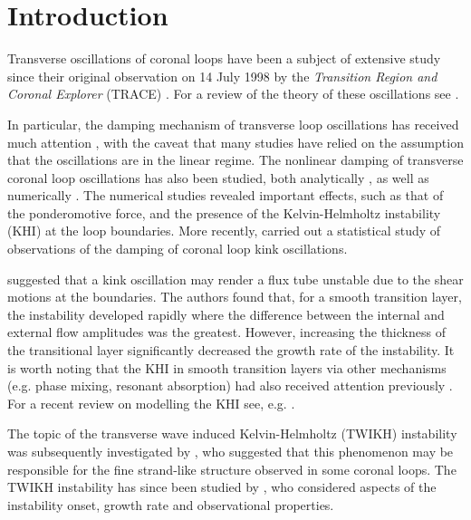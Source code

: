 \documentclass[12pt]{ociamthesis}
\begin{document}
\section{Introduction}
\label{sec:c3intro}

Transverse oscillations of coronal loops have been a subject of extensive study since their original observation on 14 July 1998 by the \textit{Transition Region and Coronal Explorer} (TRACE) \citep{Aschwanden1999, Nakariakov1999}. For a review of the theory of these oscillations see \cite{Ruderman2009}.

In particular, the damping mechanism of transverse loop oscillations has received much attention \citep[e.g.][]{Ruderman2002, Goossens2002, TVD2004, Dymova2006, Williamson2014}, with the caveat that many studies have relied on the assumption that the oscillations are in the linear regime.
The nonlinear damping of transverse coronal loop oscillations has also been studied, both analytically \citep{Ruderman2010b, Ruderman2014, Ruderman2017}, as well as numerically \citep[e.g.][]{Terradas2004, Magyar2016a}.
The numerical studies revealed important effects, such as that of the ponderomotive force, and the presence of the Kelvin-Helmholtz instability (KHI) at the loop boundaries.
More recently, \cite{Goddard2016} carried out a statistical study of observations of the damping of coronal loop kink oscillations.

\cite{Terradas2008} suggested that a kink oscillation may render a flux tube unstable due to the shear motions at the boundaries.
The authors found that, for a smooth transition layer, the instability developed rapidly where the difference between the internal and external flow amplitudes was the greatest.
However, increasing the thickness of the transitional layer significantly decreased the growth rate of the instability.
It is worth noting that the KHI in smooth transition layers via other mechanisms (e.g. phase mixing, resonant absorption) had also received attention previously \citep[see, for example,][]{Heyvaerts1983, Ofman1994, Poedts1997}.
For a recent review on modelling the KHI see, e.g. \cite{Zhelyazkov2015}.

The topic of the transverse wave induced Kelvin-Helmholtz (TWIKH) instability was subsequently investigated by \cite{Antolin2014}, who suggested that this phenomenon may be responsible for the fine strand-like structure observed in some coronal loops.
The TWIKH instability has since been studied by \cite{Antolin2016, Magyar2016a, Magyar2016b, Karampelas2017, Howson2017a, Howson2017b, Karampelas2018}, who considered aspects of the instability onset, growth rate and observational properties.
\end{document}
